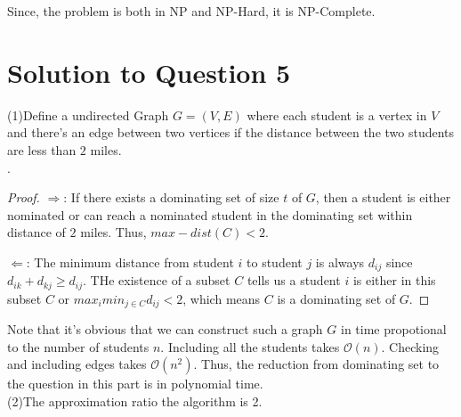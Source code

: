 \documentclass[11pt]{article}
\renewcommand{\O}{\mathcal{O}}
\begin{document}
   Since, the problem is both in NP and NP-Hard, it is NP-Complete.

\newpage
\section{Solution to Question 5} 
(1)Define a undirected Graph $G = (V, E)$ where each student is a vertex in $V$ and there's an edge between two vertices if the distance between the two students are less than $2$ miles. \\

.

\begin{proof}
$\Rightarrow$: If there exists a dominating set of size $t$ of $G$, then a student is either nominated or can reach a nominated student in the dominating set within distance of $2$ miles.
Thus, $max-dist(C) < 2$.

$\Leftarrow$: The minimum distance from student $i$ to student $j$ is always $d_{ij}$ since $d_{ik} + d_{kj} \geq d_{ij}$. THe existence of a subset $C$ tells us a student $i$ is either in this subset $C$ or $max_imin_{j \in C} d_{ij} < 2$, which means $C$ is a dominating set of $G$.
\end{proof}

\noindent Note that it's obvious that we can construct such a graph $G$ in time propotional to the number of students $n$.
Including all the students takes $\O(n)$.
Checking and including edges takes $\O(n^2)$.
Thus, the reduction from dominating set to the question in this part is in polynomial time.\\

\noindent (2)The approximation ratio the algorithm is 2.
\end{document}
